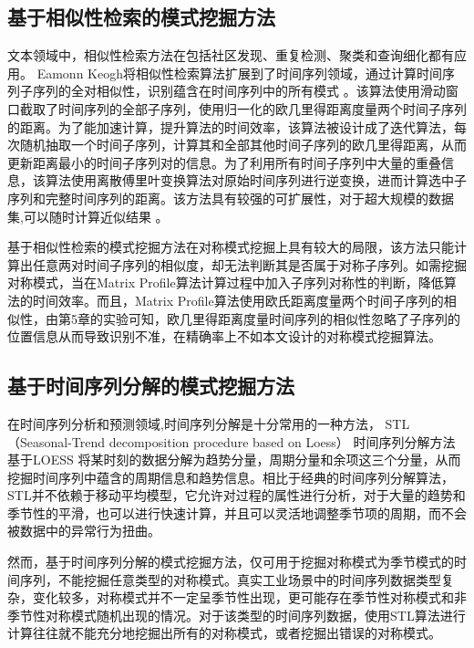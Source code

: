 \subsection{基于相似性检索的模式挖掘方法}
文本领域中，相似性检索方法在包括社区发现、重复检测、聚类和查询细化都有应用\cite{DBLP:conf/www/BayardoMS07}。
Eamonn Keogh将相似性检索算法扩展到了时间序列领域，通过计算时间序列子序列的全对相似性，识别蕴含在时间序列中的所有模式
\cite{DBLP:conf/kdd/RakthanmanonCMBWZZK12}。该算法使用滑动窗口截取了时间序列的全部子序列，使用归一化的欧几里得距离度量两个时间子序列的距离。为了能加速计算，提升算法的时间效率，该算法被设计成了迭代算法，每次随机抽取一个时间子序列，计算其和全部其他时间子序列的欧几里得距离，从而更新距离最小的时间子序列对的信息。为了利用所有时间子序列中大量的重叠信息，该算法使用离散傅里叶变换算法对原始时间序列进行逆变换，进而计算选中子序列和完整时间序列的距离。该方法具有较强的可扩展性，对于超大规模的数据集,可以随时计算近似结果
\cite{DBLP:conf/icdm/ZhuZSYFMBK16}。

基于相似性检索的模式挖掘方法在对称模式挖掘上具有较大的局限，该方法只能计算出任意两对时间子序列的相似度，却无法判断其是否属于对称子序列。如需挖掘对称模式，当在Matrix Profile算法计算过程中加入子序列对称性的判断，降低算法的时间效率。而且，Matrix Profile算法使用欧氏距离度量两个时间子序列的相似性，由第5章的实验可知，欧几里得距离度量时间序列的相似性忽略了子序列的位置信息从而导致识别不准，在精确率上不如本文设计的对称模式挖掘算法。

\subsection{基于时间序列分解的模式挖掘方法}
在时间序列分析和预测领域,时间序列分解是十分常用的一种方法，
STL（Seasonal-Trend decomposition procedure based on Loess）\cite{DBLP:conf/www/BayardoMS07}
时间序列分解方法基于LOESS\cite{DBLP:books/lib/HastieTF09}
将某时刻的数据分解为趋势分量，周期分量和余项这三个分量，从而挖掘时间序列中蕴含的周期信息和趋势信息。相比于经典的时间序列分解算法，STL并不依赖于移动平均模型，它允许对过程的属性进行分析，对于大量的趋势和季节性的平滑，也可以进行快速计算，并且可以灵活地调整季节项的周期，而不会被数据中的异常行为扭曲。

然而，基于时间序列分解的模式挖掘方法，仅可用于挖掘对称模式为季节模式的时间序列，不能挖掘任意类型的对称模式。真实工业场景中的时间序列数据类型复杂，变化较多，对称模式并不一定呈季节性出现，更可能存在季节性对称模式和非季节性对称模式随机出现的情况。对于该类型的时间序列数据，使用STL算法进行计算往往就不能充分地挖掘出所有的对称模式，或者挖掘出错误的对称模式。

